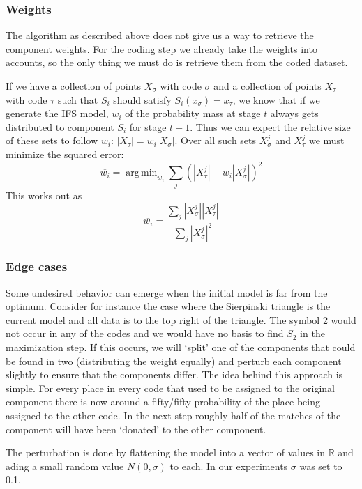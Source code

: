 \documentclass[10pt,a4paper,oneside]{article}
\theoremstyle{definition}
\DeclareMathOperator*{\argmin}{arg\,min}
\begin{document}
\subsubsection*{Weights}

The algorithm as described above does not give us a way to retrieve the component weights. For the coding step we already take the weights into accounts, so the only thing we must do is retrieve them from the coded dataset. 

If we have a collection of points $X_\sigma$ with code $\sigma$ and a collection of points $X_\tau$ with code $\tau$ such that $S_i$ should satisfy $S_i(x_\sigma) = x_\tau$, we know that if we generate the IFS model, $w_i$ of the probability mass at stage $t$ always gets distributed to component $S_i$ for stage $t + 1$. Thus we can expect the relative size of these sets to follow $w_i$: $|X_\tau| = w_i |X_\sigma|$. Over all such sets $X_\sigma^j$ and $X_\tau^j$ we must minimize the squared error:
\[
\overline{w_i} = \argmin_{w_i} \sum_{j} \left( |X_\tau^j| - w_i |X_\sigma^j| \right)^2
\]
This works out as 
\[
\overline{w_i} = \frac{\sum_{j}|X_\sigma^j||X_\tau^j|}{\sum_{j}|X_\sigma^j|^2}
\]

\subsubsection*{Edge cases}

Some undesired behavior can emerge when the initial model is far from the optimum. Consider for instance the case where the Sierpinski triangle is the current model and all data is to the top right of the triangle. The symbol 2 would not occur in any of the codes and we would have no basis to find $S_2$ in the maximization step. If this occurs, we will `split' one of the components that could be found in two (distributing the weight equally) and perturb each component slightly to ensure that the components differ. The idea behind this approach is simple. For every place in every code that used to be assigned to the original component there is now around a fifty/fifty probability of the place being assigned to the other code. In the next step roughly half of the matches of the component will have been `donated' to the other component.

The perturbation is done by flattening the model into a vector of values in ${\mathbb R}$ and ading a small random value $N(0, \sigma)$ to each. In our experiments $\sigma$ was set to 0.1.

\end{document}
